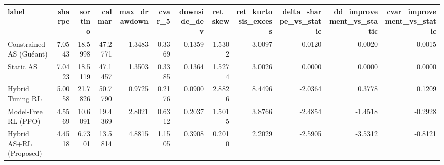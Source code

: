\begin{tabular}{lrrrrrrrrrrr}
\toprule
label & sharpe & sortino & calmar & max\_drawdown & cvar\_5 & downside\_dev & ret\_skew & ret\_kurtosis\_excess & delta\_sharpe\_vs\_static & dd\_improvement\_vs\_static & cvar\_improvement\_vs\_static \\
\midrule
Constrained AS (Guéant) & 7.0543 & 18.5998 & 47.2771 & 1.3483 & 0.3369 & 0.1359 & 1.5302 & 3.0097 & 0.0120 & 0.0020 & 0.0015 \\
Static AS & 7.0423 & 18.5119 & 47.1457 & 1.3503 & 0.3385 & 0.1364 & 1.5274 & 3.0026 & 0.0000 & 0.0000 & 0.0000 \\
Hybrid Tuning RL & 5.0058 & 21.7826 & 50.7790 & 0.9725 & 0.2176 & 0.0900 & 2.8826 & 8.4496 & -2.0364 & 0.3778 & 0.1209 \\
Model-Free RL (PPO) & 4.5569 & 10.6091 & 19.4369 & 2.8021 & 0.6312 & 0.2037 & 1.5015 & 3.8766 & -2.4854 & -1.4518 & -0.2928 \\
Hybrid AS+RL (Proposed) & 4.4518 & 6.7301 & 13.5814 & 4.8815 & 1.1505 & 0.3908 & 0.2010 & 2.2029 & -2.5905 & -3.5312 & -0.8121 \\
\bottomrule
\end{tabular}
